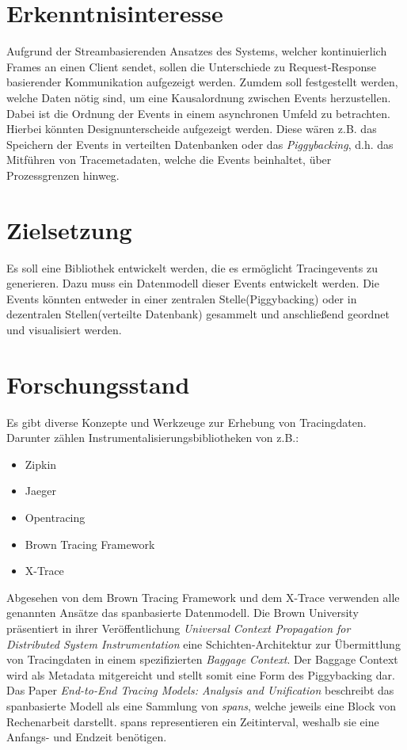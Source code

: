 \documentclass[a4paper]{article}
\begin{document}
\section{Erkenntnisinteresse}
	Aufgrund der Streambasierenden Ansatzes des Systems, welcher kontinuierlich Frames an einen Client sendet, sollen die Unterschiede zu Request-Response basierender Kommunikation aufgezeigt werden. Zumdem soll festgestellt werden, welche Daten nötig sind, um eine Kausalordnung zwischen Events herzustellen. Dabei ist die Ordnung der Events in einem asynchronen Umfeld zu betrachten. Hierbei könnten Designunterscheide aufgezeigt werden. Diese wären z.B. das Speichern der Events in verteilten Datenbanken oder das \emph{Piggybacking}, d.h. das Mitführen von Tracemetadaten, welche die Events beinhaltet, über Prozessgrenzen hinweg.  
	
\section{Zielsetzung}
	Es soll eine Bibliothek entwickelt werden, die es ermöglicht Tracingevents zu generieren. Dazu muss ein Datenmodell dieser Events entwickelt werden. Die Events könnten entweder in einer zentralen  Stelle(Piggybacking) oder in dezentralen Stellen(verteilte Datenbank) gesammelt und anschließend geordnet und visualisiert werden. 
	
\section{Forschungsstand}
	Es gibt diverse Konzepte und Werkzeuge zur Erhebung von Tracingdaten. Darunter zählen Instrumentalisierungsbibliotheken von z.B.:
	\begin{itemize}
		\item Zipkin
		\item Jaeger
		\item Opentracing
		\item Brown Tracing Framework
		\item X-Trace
	\end{itemize}
	Abgesehen von dem Brown Tracing Framework und dem X-Trace verwenden alle genannten Ansätze das spanbasierte Datenmodell. Die Brown University präsentiert in ihrer Veröffentlichung \emph{Universal Context Propagation for Distributed System Instrumentation} eine Schichten-Architektur zur Übermittlung von Tracingdaten in einem spezifizierten \emph{Baggage Context}. Der Baggage Context wird als Metadata mitgereicht und stellt somit eine Form des Piggybacking dar.  Das Paper \emph{End-to-End Tracing Models: Analysis and Unification} beschreibt das spanbasierte Modell als eine Sammlung von \emph{spans}, welche jeweils eine Block von Rechenarbeit darstellt. spans representieren ein Zeitinterval, weshalb sie eine Anfangs- und Endzeit benötigen.
\end{document}
